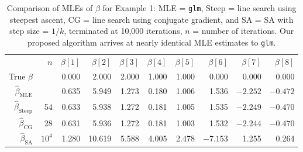 \begin{table}[h!]
\caption[Comparison of MLEs of $\beta$ for logistic regression example]{Comparison of MLEs of $\beta$ for Example 1: MLE = \texttt{glm}, Steep = line 
search using steepest ascent, 
CG = line search using conjugate gradient, and SA =  SA with step size = $1/k$, 
terminated at 10,000 iterations,
$n$ = number of iterations.  Our 
proposed algorithm arrives at nearly identical MLE estimates to \texttt{glm}.}
\begin{center}
\begin{tabular}{rrrrrrrrrr}
  \hline
 & $n$ & $\beta[1]$ & $\beta[2]$ & $\beta[3]$ & $\beta[4]$ & $\beta[5]$ & $\beta[6]$ & 
$\beta[7]$ & $\beta[8]$ \\ 
True $\beta$ & & 0.000 & 2.000 & 2.000 & 1.000 & 1.000 & 0.000 & 0.000 & 0.000 \\ 
  $\hat{\beta}_{\textrm{MLE}}$ & & 0.635 & 5.949 & 1.273 & 0.180 & 1.006 & 1.536 & 
$-2.252$ & $-0.472$ \\ 
  $\hat{\beta}_{\textrm{Steep}}$ & 54 & 0.633 & 5.938 & 1.272 & 0.181 & 1.005 & 1.535 
& $-2.249$ & $-0.470$ \\ 
  $\hat{\beta}_{\textrm{CG}}$ & 28 & 0.631 & 5.936 & 1.272 & 0.181 & 1.003 & 1.532 & 
$-2.244$ & $-0.470$ \\    
  $\hat{\beta}_{\textrm{SA}}$ & $10^4$ & 1.280 & 10.619 & 5.588 & 4.005 & 2.478 & 
$-7.153$ & 1.255 & 0.264 \\ 
  \hline
\end{tabular}
\end{center}
\label{Table:Logistic}
\end{table}


